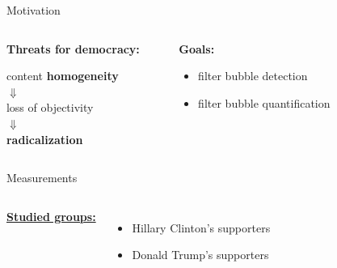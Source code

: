 \documentclass{beamer}
\begin{document}
\begin{frame}[fragile]
\begin{columns}[T]
\begin{column}{.33\textwidth}
\end{column}
\begin{column}{.63\textwidth}
\begin{customalertblock}{Motivation}
    \begin{columns}
        \begin{column}{.5\textwidth}
            \begin{large}\textbf{Threats for democracy:}\end{large}
            \vspace{0.5cm}
            \center
            content \textbf{homogeneity}\\
            $\Downarrow$\\
            loss of objectivity\\
            $\Downarrow$\\
            \textbf{radicalization}
        \end{column}
        \begin{column}{.5\textwidth}
            \begin{large}\textbf{Goals:}\end{large}
            \vspace{0.5cm}
            \begin{itemize}
                \item filter bubble detection
                \item filter bubble quantification
            \end{itemize}
        \end{column}
    \end{columns}
\end{customalertblock}
\begin{block}{Measurements}
    \begin{columns}
            \underline{\textbf{Studied groups:}}
            \vspace{1cm}
            \begin{itemize}
                \item Hillary Clinton's supporters
                \item Donald Trump's supporters

\end{itemize}
\end{columns}
\end{block}
\end{column}
\end{columns}
\end{frame}
\end{document}

